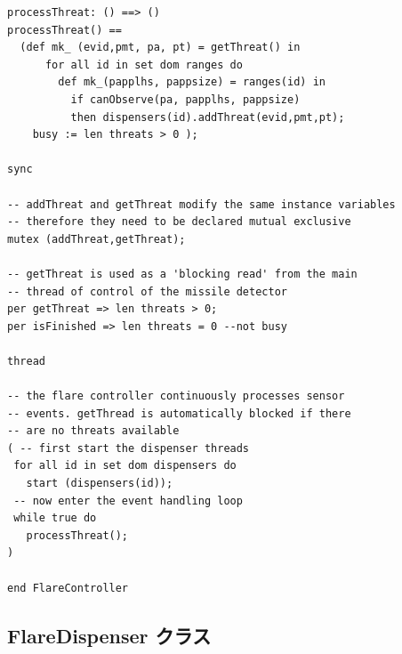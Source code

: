 \documentclass[\pformat,12pt]{jreport}
\begin{document}
\begin{lstlisting}
processThreat: () ==> ()
processThreat() ==
  (def mk_ (evid,pmt, pa, pt) = getThreat() in
      for all id in set dom ranges do
        def mk_(papplhs, pappsize) = ranges(id) in
          if canObserve(pa, papplhs, pappsize)
          then dispensers(id).addThreat(evid,pmt,pt);
    busy := len threats > 0 );

sync

-- addThreat and getThreat modify the same instance variables
-- therefore they need to be declared mutual exclusive
mutex (addThreat,getThreat);

-- getThreat is used as a 'blocking read' from the main
-- thread of control of the missile detector
per getThreat => len threats > 0;
per isFinished => len threats = 0 --not busy

thread

-- the flare controller continuously processes sensor
-- events. getThread is automatically blocked if there
-- are no threats available
( -- first start the dispenser threads
 for all id in set dom dispensers do
   start (dispensers(id));
 -- now enter the event handling loop
 while true do
   processThreat();
)

end FlareController
\end{lstlisting}

\subsection{FlareDispenser クラス}
\end{document}
